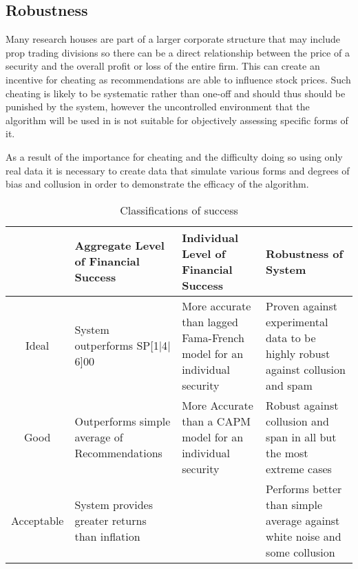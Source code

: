 \subsection{Robustness}
Many research houses are part of a larger corporate structure that may include prop trading divisions so there can be a direct relationship between the price of a security and the overall profit or loss of the entire firm. This can create an incentive for cheating as recommendations are able to influence stock prices. Such cheating is likely to be systematic rather than one-off and should thus should be punished by the system, however the uncontrolled environment that the algorithm will be used in is not suitable for objectively assessing specific forms of it. 

As a result of the importance for cheating and the difficulty doing so using only real data it is necessary to create data that simulate various forms and degrees of bias and collusion in order to demonstrate the efficacy of the algorithm.

\begin{table}[p]
    \centering
    \begin{tabularx}{0.95\textwidth}{@{\extracolsep{\fill}}cXXX}
        \toprule\toprule
         & Aggregate Level of Financial Success  &Individual Level of Financial Success & Robustness of System \\\midrule
        Ideal & System outperforms SP[1$|$4$|$6]00 & More accurate than lagged Fama-French model for an individual security & Proven against experimental data to be highly robust against collusion and spam\\
        \addlinespace
        Good & Outperforms simple average of Recommendations & More Accurate than a CAPM model for an individual security & Robust against collusion and span in all but the most extreme cases\\
        \addlinespace
        Acceptable & System provides greater returns than inflation && Performs better than simple average against white noise and some collusion \\ \bottomrule
    \end{tabularx}
    \caption[Classifications of success]{Classifications of success  }
    \label{tab:success}
\end{table}


